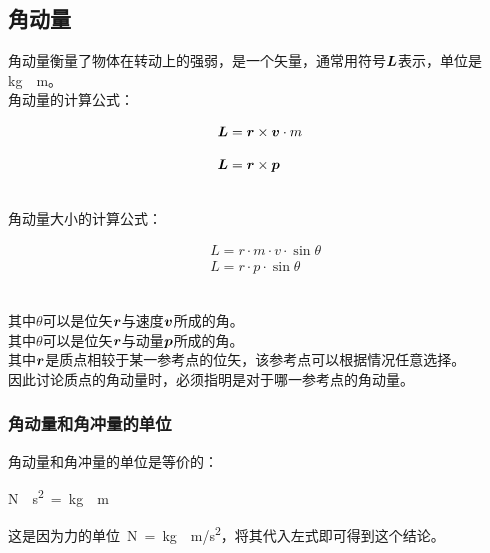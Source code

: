 \documentclass[UTF8]{ctexart}
\newcommand*{\veb}[1]{\vb*{#1}}
\begin{document}
\subsection{角动量}
    角动量衡量了物体在转动上的强弱，是一个矢量，通常用符号$\veb{L}$表示，单位是\si{kg\cdot m}。\\[3mm]
    角动量的计算公式：
    \begin{large}
        \begin{align*}
            &\veb{L}=\veb{r}\times\veb{v}\cdot m\\[3mm]
            &\veb{L}=\veb{r}\times\veb{p}
        \end{align*}
    \end{large}\\
    角动量大小的计算公式：
    \begin{large}
        \begin{align*}
            &L=r\cdot m\cdot v\cdot\sin{\theta}\\[3mm]
            &L=r\cdot p\cdot\sin{\theta}
        \end{align*}
    \end{large}\\
    其中$\theta$可以是位矢$\veb{r}$与速度$\veb{v}$所成的角。\\[3mm]
    其中$\theta$可以是位矢$\veb{r}$与动量$\veb{p}$所成的角。\\[3mm]
    其中$\veb{r}$是质点相较于某一参考点的位矢，该参考点可以根据情况任意选择。\\[3mm]
    因此讨论质点的角动量时，必须指明是对于哪一参考点的角动量。

\newpage

\subsubsection{角动量和角冲量的单位}
    角动量和角冲量的单位是等价的：
    \begin{large}
        \begin{center}
            \si{N\cdot s^2}~=~\si{kg\cdot m}\\[6mm]
        \end{center}
    \end{large}
    这是因为力的单位~\si{N=kg\cdot m/s^2}，将其代入左式即可得到这个结论。\\
\end{document}
